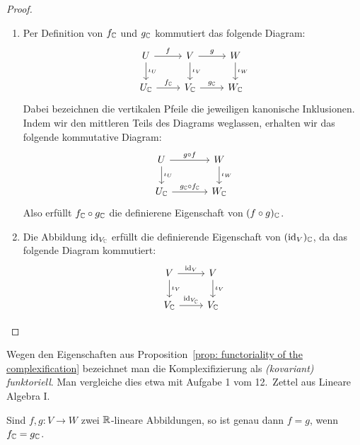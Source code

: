 \documentclass[a4paper,10pt]{article}
\begin{document}
\begin{proof}
  \begin{enumerate}[leftmargin=*]
    \item
      Per Definition von $f_{\mathbb{C}}$ und $g_{\mathbb{C}}$ kommutiert das folgende Diagram:
      \[
      \begin{tikzcd}
          U       \arrow[r, "f"]  \arrow[d, "\iota_U"]
        & V       \arrow[r, "g"]  \arrow[d, "\iota_V"]
        & W                       \arrow[d, "\iota_W"]
        \\
          U_\Cbb  \arrow[r, "f_\Cbb"]
        & V_\Cbb  \arrow[r, "g_\Cbb"]
        & W_\Cbb
      \end{tikzcd}
      \]
      Dabei bezeichnen die vertikalen Pfeile die jeweiligen kanonische Inklusionen.
      Indem wir den mittleren Teils des Diagrams weglassen, erhalten wir das folgende kommutative Diagram:
      \[
      \begin{tikzcd}[column sep=large]
          U       \arrow[r, "g \circ f"]            \arrow[d, "\iota_U"]
        & W                                         \arrow[d, "\iota_W"]
        \\
          U_\Cbb  \arrow[r, "g_\Cbb \circ f_\Cbb"]
        & W_\Cbb
      \end{tikzcd}
      \]
      Also erfüllt $f_{\mathbb{C}} \circ g_{\mathbb{C}}$ die definierene Eigenschaft von $(f \circ g)_{\mathbb{C}}$.
    \item
      Die Abbildung $\operatorname{id}_{V_{\mathbb{C}}}$ erfüllt die definierende Eigenschaft von $(\operatorname{id}_V)_{\mathbb{C}}$, da das folgende Diagram kommutiert:
      \[
      \begin{tikzcd}
          V       \arrow[r, "\id_V"]        \arrow[d, "\iota_V"]
        & V                                 \arrow[d, "\iota_V"]
        \\
          V_\Cbb  \arrow[r, "\id_{V_\Cbb}"]
        & V_\Cbb
      \end{tikzcd}
      \]
  \end{enumerate}
\end{proof}


\begin{remark}
  Wegen den Eigenschaften aus Proposition~\ref{prop: functoriality of the complexification} bezeichnet man die Komplexifizierung als \emph{(kovariant) funktoriell}.
  Man vergleiche dies etwa mit Aufgabe 1 vom 12.\ Zettel aus Lineare Algebra I.
\end{remark}



\begin{lemma}\label{lemma: commuting in complexification}
  Sind $f, g \colon V \to W$ zwei $\mathbb{R}$-lineare Abbildungen, so ist genau dann $f = g$, wenn $f_{\mathbb{C}} = g_{\mathbb{C}}$.
\end{lemma}
\end{document}
